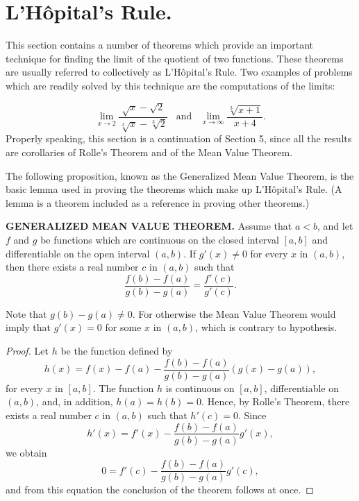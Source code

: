 \section{L'H\^{o}pital's Rule.}\label{sec 2.7}
This section contains a number of theorems which provide an important technique for finding the limit of the quotient of two functions. These theorems are usually referred to collectively as L'H\^{o}pital's Rule. Two examples of problems which are readily solved by this technique are the computations of the limits:  

$$
\lim_{x \rightarrow 2}\frac{\sqrt x - \sqrt 2}{\sqrt[3]{x} - \sqrt[3]{2}}
\;\;\;\mbox{and}\;\;\; \lim_{x \rightarrow \infty}\frac{\sqrt[3]{x + 1}}{x + 4}.
$$
\noindent Properly speaking, this section is a continuation of Section 5, since all the results are corollaries of Rolle's Theorem and of the Mean Value Theorem.

The following proposition, known as the Generalized Mean Value Theorem, is the basic lemma used in proving the theorems which make up L'H\^{o}pital's Rule. (A lemma is a theorem included as a reference in proving other theorems.)

\begin{theorem} %
\textbf{GENERALIZED MEAN VALUE THEOREM.}  Assume that $a < b$, and let $f$ and $g$ be functions which are continuous on the closed interval $[a, b]$ and differentiable on the open interval $(a, b)$. If $g'(x) \neq 0$ for every $x$ in $(a, b)$, then there exists a real number $c$ in $(a, b)$ such that
$$
\frac{f(b) - f(a)}{g(b) - g(a)} = \frac{f'(c)}{g'(c)}.
$$
\end{theorem}

Note that $g(b)-g(a) \neq 0$. For otherwise the Mean Value Theorem would imply that $g'(x) = 0$ for some $x$ in $(a, b)$, which is contrary to hypothesis.

\begin{proof}
Let $h$ be the function defined by 
$$
h(x) = f(x) - f(a) -\frac{f(b) - f(a)}{g(b) - g(a)} (g(x) - g(a)),
$$
for every $x$ in $[a, b]$. The function $h$ is continuous on $[a, b]$, differentiable on $(a, b)$, and, in addition, $h(a) = h(b) = 0$. Hence, by Rolle's Theorem, there
exists a real number $c$ in $(a, b)$ such that $h'(c) = 0$. Since
$$
h'(x) = f'(x) - {\frac{f(b) - f(a)}{g(b) - g(a)}} g'(x), 
$$
we obtain
$$
0 = f'(c) - {\frac{f(b) - f(a)}{g(b) - g(a)}} g'(c), 
$$
and from this equation the conclusion of the theorem follows at once.
\end{proof}

